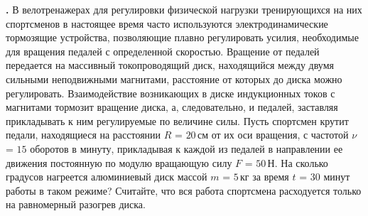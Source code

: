 \documentclass[12pt,a4paper]{article}
\newif\ifShowSolutions
\newcounter{banktask}
\newcommand{\BankTask}[3]{%
  \refstepcounter{banktask}%
  \Needspace{35mm}\par\medskip\noindent\begin{minipage}{\linewidth}%
  \noindent\textbf{\thebanktask.}\quad #2\par
  \ifShowSolutions
    #3\par
    \ifdefined\TutorEdition
      \ifcsname TutorSource#1\endcsname
        \smallskip{\small\csname TutorSource#1\endcsname\par}%
      \fi
    \fi
  \fi
  \end{minipage}\par\medskip
}
\begin{document}
\BankTask{sdamgia-29128}{
В велотренажерах для регулировки физической нагрузки тренирующихся на них спортсменов в настоящее время часто используются электродинамические тормозящие устройства, позволяющие плавно регулировать усилия, необходимые для вращения педалей с определенной скоростью. Вращение от педалей передается на массивный токопроводящий диск, находящийся между двумя сильными неподвижными магнитами, расстояние от которых до диска можно регулировать. Взаимодействие возникающих в диске индукционных токов с магнитами тормозит вращение диска, а, следовательно, и педалей, заставляя прикладывать к ним регулируемые по величине силы.
Пусть спортсмен крутит педали, находящиеся на расстоянии $R$ = $20\,\text{см}$ от их оси вращения, с частотой $\nu$ = $15$ оборотов в минуту, прикладывая к каждой из педалей в направлении ее движения постоянную по модулю вращающую силу $F$ = $50\,\text{Н}$. На сколько градусов нагреется алюминиевый диск массой $m$ = $5\,\text{кг}$ за время $t$ = $30$ минут работы в таком режиме? Считайте, что вся работа спортсмена расходуется только на равномерный разогрев диска.
}{
\smallskip\noindent\textbf{Решение}\par
$1$. Найдем вначале мощность $P$, развиваемую спортсменом во время тренировки на велотренажере. Поскольку сила $F$ прикладывается в направлении движения каждой из двух педалей по окружности радиусом $R$ с линейной скоростью $v=\omega R$ где угловая скорость $\omega$ связана с частотой $\nu$ вращения педалей соотношением $\omega=2\pi\nu$ то: 


$P=F\cdot2v=F\cdot2\omega R=4\pi\nu FR$

$2$. Работа, совершенная спортсменом за время $t$, равна: 


$A=P\cdot t=4\pi\nu FRt$

$3$. Поскольку по условию вся эта работа превращается в количество теплоты $Q$, идущее на нагревание алюминиевого диска массой $m$ с удельной теплоемкостью $c$ на $\Delta T$ градусов, то: 


$A=Q=cm\Delta T=4\pi\nu FRt$

$4$. Таким образом, из последнего уравнения получаем: $\Delta T=\frac{4\pi\nu FRt}{cm}$
$5$. Переводя численные данные из условия в систему СИ, используя табличные данные и подставляя их все в полученное выражение, получаем: 


$\Delta T=\frac{4\pi\nu FRt}{cm}=\frac{4\cdot3{,}14\cdot0{,}25\cdot50\cdot0{,}2\cdot1800}{900\cdot5}=12{,}56\,{}^\circ\text{C}.$

Ответ: $12{,}56\,{}^\circ\text{C}.$
}
\end{document}
